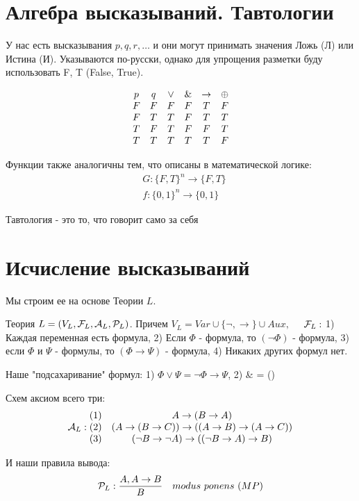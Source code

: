 

\title{}
\author{Козырнов Александр Дмитриевич, ИУ7-32Б}
\date{\today}


\section{Алгебра высказываний. Тавтологии}

У нас есть высказывания $p,q,r,\ldots$ и они могут принимать
значения Ложь (Л) или Истина (И). Указываются по-русски, однако
для упрощения разметки буду использовать F, T (False, True).

$$
\begin{matrix}
    p & q & \lor & \operatorname{\&} & \to & \oplus\\
    F & F & F & F & T & F\\
    F & T & T & F & T & T \\
    T & F & T & F & F & T\\
    T & T & T & T &T & F
\end{matrix}
$$

Функции также аналогичны тем, что описаны в математической логике:
\begin{align*}
    &G: \{F, T\}^{n} \to \{F,T\}\\
    &f: \{0,1\}^{n} \to \{0,1\}  
\end{align*}

\begin{definition}
Тавтология - это то, что говорит само за себя
\end{definition}

\section{Исчисление высказываний}

Мы строим ее на основе Теории $L$.

\begin{definition}
Теория $L = (V_L, {\cal F}_L, {\cal A}_L, {\cal P}_L)$. Причем 
$V_L = Var \cup \{\lnot, \to \} \cup Aux, \quad$ ${\cal F}_L: $ 1) Каждая переменная есть формула,
2) Если $\Phi$ - формула, то  $(\lnot \Phi)$ - формула, 3) если  $\Phi$ и $\Psi$ - формулы,
то  $(\Phi \to \Psi)$ - формула, 4) Никаких других формул нет.


Наше "подсахаривание" формул:
    1) $\Phi \lor \Psi = \lnot\Phi \to \Psi$,
    2) \Phi \& \Psi = \lnot(\Phi \to \lnot \Psi)


Схем аксиом всего три:
\[
{\cal A}_L:
\begin{matrix}
    (1) & A \to (B \to A)\\
    (2) & (A \to (B \to C)) \to ((A \to B) \to (A \to C))\\
    (3) & (\lnot B \to \lnot A) \to ((\lnot B \to A) \to B)
\end{matrix}
\] 

И наши правила вывода:
\[
    {\cal P}_L: \frac{A, A\to B}{B} \quad modus \text{ } ponens \text{ } (MP)
\] 
\end{definition}

